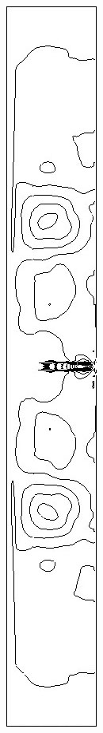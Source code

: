 \begin{figure}[h]
\begin{subfigure}[b]{0.15\textwidth}
\caption{ }
\end{subfigure}
\begin{subfigure}[b]{0.15\textwidth}
\centering
\includegraphics[width=\textwidth]{png/cranium/2d-sxx-02.png}

\end{subfigure}
\end{figure}
